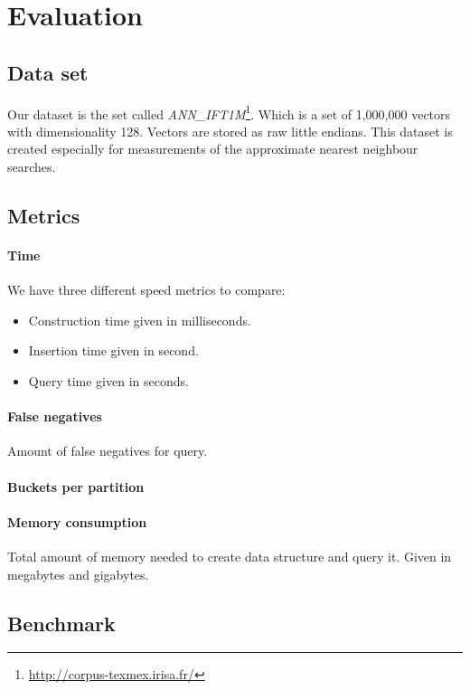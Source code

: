 \section{Evaluation}
\label{evaluation}

\subsection{Data set}

Our dataset is the set called \textit{ANN\_IFT1M}\footnote{\url{http://corpus-texmex.irisa.fr/}}. Which is a set of 1,000,000 vectors with dimensionality 128. Vectors are stored as raw little endians. This dataset is created especially for measurements of the approximate nearest neighbour searches.

\subsection{Metrics}

\paragraph{Time} We have three different speed metrics to compare:

\begin{itemize}
  \item Construction time given in milliseconds.
  \item Insertion time given in second.
  \item Query time given in seconds.
\end{itemize}

\paragraph{False negatives} Amount of false negatives for query.
\paragraph{Buckets per partition}  

\paragraph{Memory consumption} Total amount of memory needed to create data structure and query it. Given in megabytes and gigabytes.

\subsection{Benchmark}

